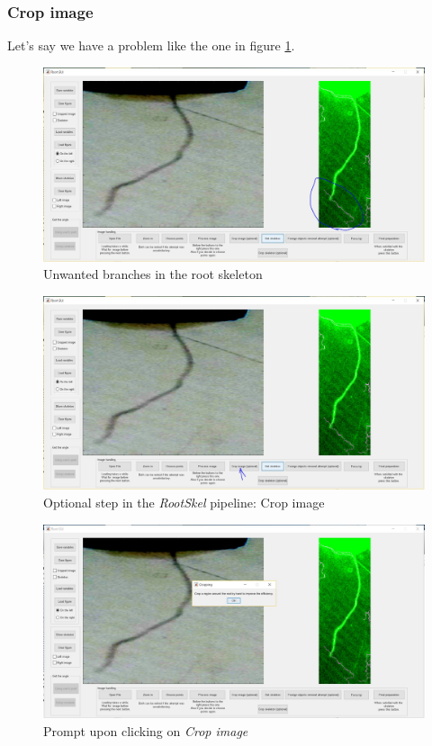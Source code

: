 \subsubsection{Crop image}

Let's say we have a problem like the one in figure \ref{fig:img46}.

\begin{figure}[H]
	\centering
	\includegraphics[width=\textwidth]{../Figures/manual/optionalC1.jpg}
	\caption{Unwanted branches in the root skeleton}
	\label{fig:img46}
\end{figure}

\begin{figure}[H]
	\centering
	\includegraphics[width=\textwidth]{../Figures/manual/optionalC2.jpg}
	\caption{Optional step in the \textit{RootSkel} pipeline: Crop image}
	\label{fig:img47}
\end{figure}

\begin{figure}[H]
	\centering
	\includegraphics[width=\textwidth]{../Figures/manual/optionalC3.jpg}
	\caption{Prompt upon clicking on \textit{Crop image}}
	\label{fig:img48}
\end{figure}

